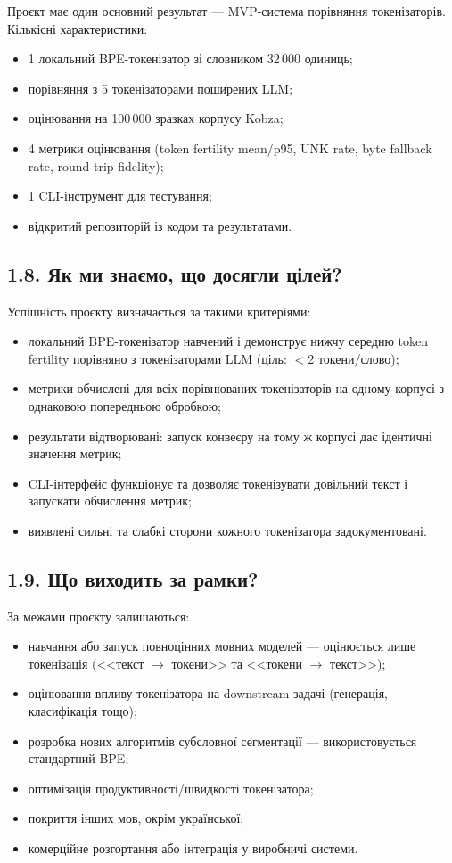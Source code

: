 \documentclass[14pt]{extarticle}
\begin{document}
Проєкт має один основний результат --- MVP-система порівняння токенізаторів. Кількісні характеристики:
\begin{itemize}
  \item 1 локальний BPE-токенізатор зі словником 32\,000 одиниць;
  \item порівняння з 5 токенізаторами поширених LLM;
  \item оцінювання на 100\,000 зразках корпусу Kobza;
  \item 4 метрики оцінювання (token fertility mean/p95, UNK rate, byte fallback rate, round-trip fidelity);
  \item 1 CLI-інструмент для тестування;
  \item відкритий репозиторій із кодом та результатами.
\end{itemize}

\subsection*{1.8. Як ми знаємо, що досягли цілей?}

Успішність проєкту визначається за такими критеріями:
\begin{itemize}
  \item локальний BPE-токенізатор навчений і демонструє нижчу середню token fertility порівняно з токенізаторами LLM (ціль: $<$2 токени/слово);
  \item метрики обчислені для всіх порівнюваних токенізаторів на одному корпусі з однаковою попередньою обробкою;
  \item результати відтворювані: запуск конвеєру на тому ж корпусі дає ідентичні значення метрик;
  \item CLI-інтерфейс функціонує та дозволяє токенізувати довільний текст і запускати обчислення метрик;
  \item виявлені сильні та слабкі сторони кожного токенізатора задокументовані.
\end{itemize}

\subsection*{1.9. Що виходить за рамки?}

За межами проєкту залишаються:
\begin{itemize}
  \item навчання або запуск повноцінних мовних моделей --- оцінюється лише токенізація (<<текст $\to$ токени>> та <<токени $\to$ текст>>);
  \item оцінювання впливу токенізатора на downstream-задачі (генерація, класифікація тощо);
  \item розробка нових алгоритмів субсловної сегментації --- використовується стандартний BPE;
  \item оптимізація продуктивності/швидкості токенізатора;
  \item покриття інших мов, окрім української;
  \item комерційне розгортання або інтеграція у виробничі системи.
\end{itemize}
\end{document}
